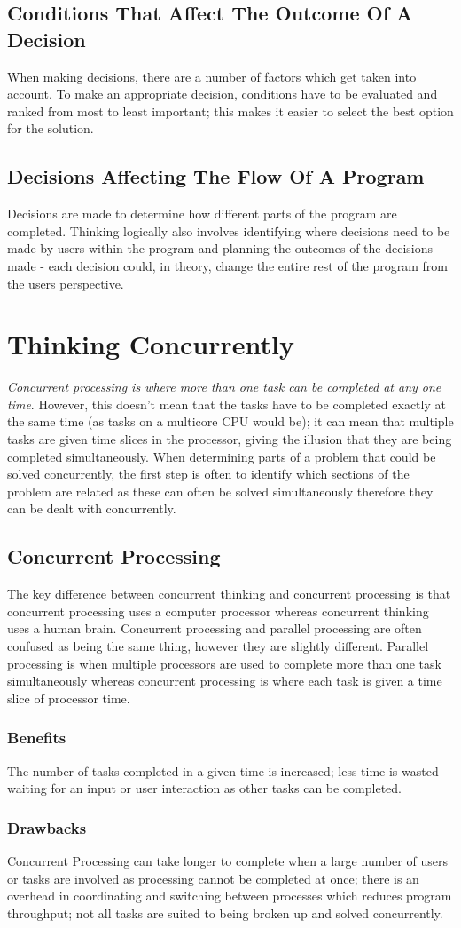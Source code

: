\documentclass[a4paper,11pt, twocolumn]{article}
\begin{document}
\subsection{Conditions That Affect The Outcome Of A Decision}
When making decisions, there are a number of factors which get taken into account. To make an appropriate decision, conditions have to be evaluated and ranked from most to least important; this makes it easier to select the best option for the solution. 
\subsection{Decisions Affecting The Flow Of A Program}
Decisions are made to determine how different parts of the program are completed. Thinking logically also involves identifying where decisions need to be made by users within the program and planning the outcomes of the decisions made - each decision could, in theory, change the entire rest of the program from the users perspective. 

\section{Thinking Concurrently}
\textit{Concurrent processing is where more than one task can be completed at any one time}. However, this doesn't mean that the tasks have to be completed exactly at the same time (as tasks on a multicore CPU would be); it can mean that multiple tasks are given time slices in the processor, giving the illusion that they are being completed simultaneously. When determining parts of a problem that could be solved concurrently, the first step is often to identify which sections of the problem are related as these can often be solved simultaneously therefore they can be dealt with concurrently.
\subsection{Concurrent Processing}
The key difference between concurrent thinking and concurrent processing is that concurrent processing uses a computer processor whereas concurrent thinking uses a human brain. Concurrent processing and parallel processing are often confused as being the same thing, however they are slightly different. Parallel processing is when multiple processors are used to complete more than one task simultaneously whereas concurrent processing is where each task is given a time slice of processor time. 
\subsubsection{Benefits}
The number of tasks completed in a given time is increased; less time is wasted waiting for an input or user interaction as other tasks can be completed.
\subsubsection{Drawbacks}
Concurrent Processing can take longer to complete when a large number of users or tasks are involved as processing cannot be completed at once; there is an overhead in coordinating and switching between processes which reduces program throughput; not all tasks are suited to being broken up and solved concurrently. 
\end{document}
